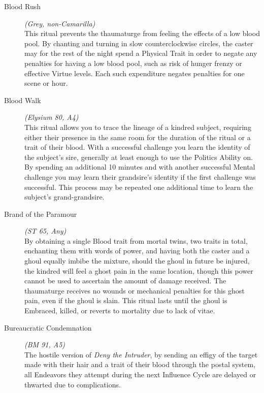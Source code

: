 \begin{description}
	\item[Blood Rush] \emph{(Grey, non-Camarilla)} \hfill \\
	This ritual prevents the thaumaturge from feeling the effects of a low blood pool. By chanting and turning in slow 
	counterclockwise circles, the caster may for the rest of the night spend a Physical Trait in order to negate any 
	penalties for having a low blood pool, such as risk of hunger frenzy or effective Virtue levels. Each such 
	expenditure negates penalties for one scene or hour. \\

	\item[Blood Walk] \emph{(Elysium 80, A4)} \hfill \\
	This ritual allows you to trace the lineage of a kindred subject, requiring either their presence in the same room 
	for the duration of the ritual or a trait of their blood.  With a successful challenge you learn the identity of the 
	subject's sire, generally at least enough to use the Politics Ability on.  By spending an additional 10 minutes and 
	with another successful Mental challenge you may learn their grandsire's identity if the first challenge was 
	successful.  This process may be repeated one additional time to learn the subject's grand-grandsire. \\

	\item[Brand of the Paramour] \emph{(ST 65, Any)} \hfill \\
	By obtaining a single Blood trait from mortal twins, two traits in total, enchanting them with words of power, 
	and having both the caster and a ghoul equally imbibe the mixture, should the ghoul in future be injured, the 
	kindred will feel a ghost pain in the same location, though this power cannot be used to ascertain the amount 
	of damage received. The thaumaturge receives no wounds or mechanical penalties for this ghost pain, even if the 
	ghoul is slain. This ritual lasts until the ghoul is Embraced, killed, or reverts to mortality due to lack of 
	vitae. \\

	\item[Bureaucratic Condemnation] \emph{(BM 91, A5)} \hfill \\
	The hostile version of \emph{Deny the Intruder}, by sending an effigy of the target made with their hair and a 
	trait of their blood through the postal system, all Endeavors they attempt during the next Influence Cycle are 
	delayed or thwarted due to complications. \\


\end{description}

